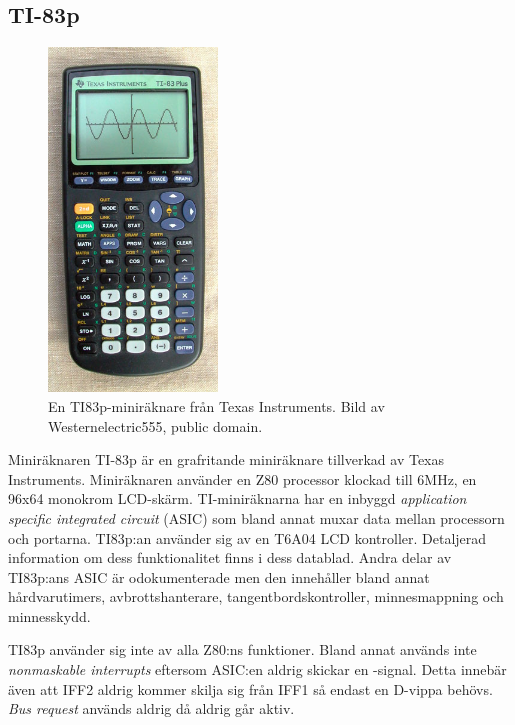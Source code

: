\documentclass[main.tex]{subfiles}
\begin{document}
\newpage
\subsection{TI-83p}

\begin{figure}
    \centering
    \includegraphics[width=0.4\textwidth, bb=0 0 284 578]{img/ti83p.jpg}
    \caption{En TI83p-miniräknare från Texas Instruments. Bild av
    Westernelectric555, public domain.}
    \label{fig:ti83p}
\end{figure}

Miniräknaren TI-83p är en grafritande miniräknare tillverkad av Texas
Instruments. Miniräknaren använder en Z80 processor klockad till 6MHz, en 96x64
monokrom LCD-skärm. TI-miniräknarna har en inbyggd {\it application specific
integrated circuit} (ASIC) som bland annat muxar data mellan processorn och
portarna. TI83p:an använder sig av en T6A04 LCD kontroller. Detaljerad
information om dess funktionalitet finns i dess datablad\cite{t6a04}. Andra
delar av TI83p:ans ASIC är odokumenterade men den innehåller bland annat
hårdvarutimers, avbrottshanterare, tangentbordskontroller, minnesmappning och
minnesskydd.

TI83p använder sig inte av alla Z80:ns funktioner. Bland annat används inte
{\it nonmaskable interrupts} eftersom ASIC:en aldrig skickar en
-signal. Detta innebär även att IFF2 aldrig kommer skilja sig från
IFF1 så endast en D-vippa behövs. {\it Bus request} används aldrig då
 aldrig går aktiv.
\end{document}
